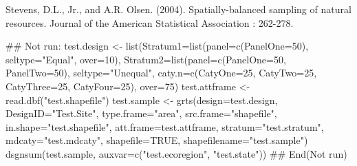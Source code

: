 \begin{References}\relax
Stevens, D.L., Jr., and A.R. Olsen. (2004). Spatially-balanced sampling of
natural resources. Journal of the American Statistical Association :
262-278.
\end{References}
\begin{SeeAlso}\relax
{}
\end{SeeAlso}
\begin{Examples}
\begin{ExampleCode}
## Not run: 
test.design <- list(Stratum1=list(panel=c(PanelOne=50),
   seltype="Equal", over=10), Stratum2=list(panel=c(PanelOne=50,
   PanelTwo=50), seltype="Unequal", caty.n=c(CatyOne=25, CatyTwo=25,
   CatyThree=25, CatyFour=25), over=75)
test.attframe <- read.dbf("test.shapefile")
test.sample <- grts(design=test.design, DesignID="Test.Site", type.frame="area",
   src.frame="shapefile", in.shape="test.shapefile", att.frame=test.attframe,
   stratum="test.stratum", mdcaty="test.mdcaty", shapefile=TRUE,
   shapefilename="test.sample")
dsgnsum(test.sample, auxvar=c("test.ecoregion", "test.state"))
## End(Not run)
\end{ExampleCode}
\end{Examples}

